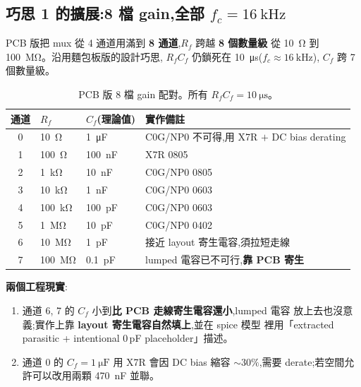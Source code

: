 \documentclass[12pt,a4paper]{article}
\begin{document}
\subsection{巧思 1 的擴展:8 檔 gain,全部 \(f_c = \SI{16}{\kilo\hertz}\)}

PCB 版把 mux 從 4 通道用滿到 \textbf{8 通道},\(R_f\) 跨越 \textbf{8 個數量級}
從 \SI{10}{\ohm} 到 \SI{100}{\mega\ohm}。沿用麵包板版的設計巧思,
\(R_f C_f\) 仍鎖死在 \SI{10}{\micro\second}(\(f_c \approx \SI{16}{\kilo\hertz}\)),
\(C_f\) 跨 7 個數量級。

\begin{table}[H]
	\centering
	\caption{PCB 版 8 檔 gain 配對。所有 \(R_f C_f = \SI{10}{\micro\second}\)。}
	\label{tab:gain-future}
	\begin{tabular}{clll}
		\toprule
		通道 & \(R_f\)             & \(C_f\)(理論值)          & 實作備註                                     \\
		\midrule
		0  & \SI{10}{\ohm}       & \SI{1}{\micro\farad}  & C0G/NP0 不可得,用 X7R \(+\) DC bias derating \\
		1  & \SI{100}{\ohm}      & \SI{100}{\nano\farad} & X7R 0805                                 \\
		2  & \SI{1}{\kilo\ohm}   & \SI{10}{\nano\farad}  & C0G/NP0 0805                             \\
		3  & \SI{10}{\kilo\ohm}  & \SI{1}{\nano\farad}   & C0G/NP0 0603                             \\
		4  & \SI{100}{\kilo\ohm} & \SI{100}{\pico\farad} & C0G/NP0 0603                             \\
		5  & \SI{1}{\mega\ohm}   & \SI{10}{\pico\farad}  & C0G/NP0 0402                             \\
		6  & \SI{10}{\mega\ohm}  & \SI{1}{\pico\farad}   & 接近 layout 寄生電容,須拉短走線                     \\
		7  & \SI{100}{\mega\ohm} & \SI{0.1}{\pico\farad} & lumped 電容已不可行,\textbf{靠 PCB 寄生}          \\
		\bottomrule
	\end{tabular}
\end{table}

\textbf{兩個工程現實}:

\begin{enumerate}[leftmargin=2em,itemsep=0pt]
	\item 通道 6, 7 的 \(C_f\) 小到\textbf{比 PCB 走線寄生電容還小},lumped 電容
	      放上去也沒意義;實作上靠 \textbf{layout 寄生電容自然填上},並在 spice 模型
	      裡用「extracted parasitic + intentional 0\,pF placeholder」描述。
	\item 通道 0 的 \(C_f = \SI{1}{\micro\farad}\) 用 X7R 會因 DC bias 縮容
	      \(\sim 30\%\),需要 derate;若空間允許可以改用兩顆 \SI{470}{\nano\farad}
	      並聯。
\end{enumerate}
\end{document}
